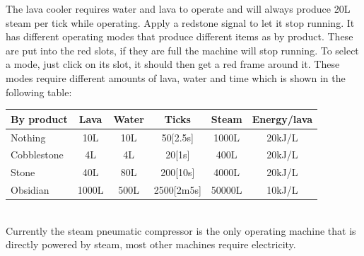 \documentclass[11pt]{article} %
\begin{document}
The lava cooler requires water and lava to operate and will always produce 20L steam per tick while operating. Apply a redstone signal to let it stop running. It has different operating modes that produce different items as by product. These are put into the red slots, if they are full the machine will stop running. To select a mode, just click on its slot, it should then get a red frame around it. These modes require different amounts of lava, water and time which is shown in the following table:\\
\begin{tabular}{| l | c | c | c | c | c |}
\hline
\bf By product & \bf Lava & \bf Water & \bf Ticks & \bf Steam & \bf Energy/lava \\
\hline
Nothing & 10L & 10L & 50[2.5s] & 1000L & 20kJ/L \\
Cobblestone & 4L & 4L & 20[1s] & 400L & 20kJ/L \\
Stone & 40L & 80L & 200[10s] & 4000L & 20kJ/L \\
Obsidian & 1000L & 500L & 2500[2m5s] & 50000L & 10kJ/L \\
\hline
\end{tabular} \\
Currently the steam pneumatic compressor is the only operating machine that is directly powered by steam, most other machines require electricity.
\end{document}
